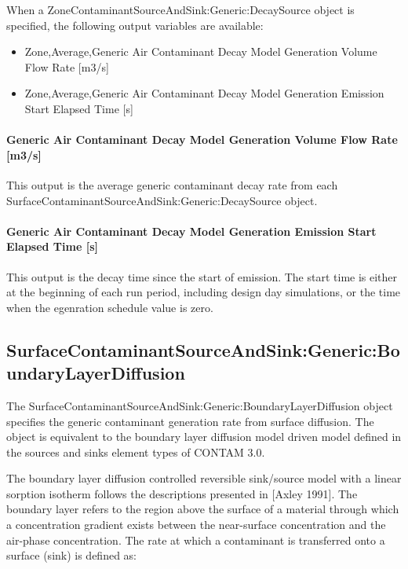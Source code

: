 When a ZoneContaminantSourceAndSink:Generic:DecaySource object is specified, the following output variables are available:

\begin{itemize}
    \tightlist
  \item
    Zone,Average,Generic Air Contaminant Decay Model Generation Volume Flow Rate {[}m3/s{]}
  \item
    Zone,Average,Generic Air Contaminant Decay Model Generation Emission Start Elapsed Time {[}s{]}
\end{itemize}

\paragraph{Generic Air Contaminant Decay Model Generation Volume Flow Rate {[}m3/s{]}}\label{generic-air-contaminant-decay-model-generation-volume-flow-rate-m3s}

This output is the average generic contaminant decay rate from each Surface\-Contaminant\-Source\-And\-Sink:\-Generic:\-Decay\-Source object.

\paragraph{Generic Air Contaminant Decay Model Generation Emission Start Elapsed Time {[}s{]}}\label{generic-air-contaminant-decay-model-generation-emission-start-elapsed-time-s}

This output is the decay time since the start of emission. The start time is either at the beginning of each run period, including design day simulations, or the time when the egenration schedule value is zero.

\subsection{Surface\-Contaminant\-Source\-And\-Sink:\-Generic:\-Boundary\-Layer\-Diffusion}\label{surfacecontaminantsourceandsinkgenericboundarylayerdiffusion}

The Surface\-Contaminant\-Source\-And\-Sink:\-Generic:\-Boundary\-Layer\-Diffusion object specifies the generic contaminant generation rate from surface diffusion. The object is equivalent to the boundary layer diffusion model driven model defined in the sources and sinks element types of CONTAM 3.0.

The boundary layer diffusion controlled reversible sink/source model with a linear sorption isotherm follows the descriptions presented in {[}Axley 1991{]}. The boundary layer refers to the region above the surface of a material through which a concentration gradient exists between the near-surface concentration and the air-phase concentration. The rate at which a contaminant is transferred onto a surface (sink) is defined as:

